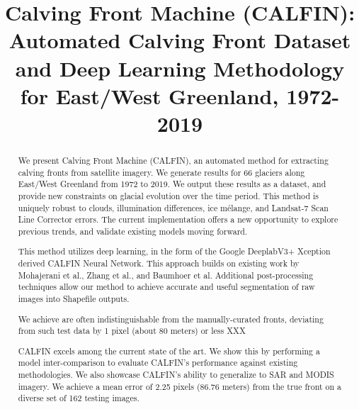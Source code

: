 \documentclass[tc, manuscript]{copernicus}
\begin{document}
\title{Calving Front Machine (CALFIN): Automated Calving Front Dataset and Deep Learning Methodology for East/West Greenland, 1972-2019}







\received{}
\pubdiscuss{} %
\revised{}
\accepted{}
\published{}

\maketitle

\begin{abstract}
We present Calving Front Machine (CALFIN), an automated method for extracting calving fronts from satellite imagery. We generate results for 66 glaciers along East/West Greenland from 1972 to 2019. We output these results as a dataset, and provide new constraints on glacial evolution over the time period. This method is uniquely robust to clouds, illumination differences, ice mélange, and Landsat-7 Scan Line Corrector errors. The current implementation offers a new opportunity to explore previous trends, and validate existing models moving forward.

This method utilizes deep learning, in the form of the Google DeeplabV3+ Xception derived CALFIN Neural Network. This approach builds on existing work by Mohajerani et al., Zhang et al., and Baumhoer et al. Additional post-processing techniques allow our method to achieve accurate and useful segmentation of raw images into Shapefile outputs. 

We achieve are often indistinguishable from the manually-curated fronts, deviating from such test data by 1 pixel (about 80 meters) or less XXX%

CALFIN excels among the current state of the art. We show this by performing a model inter-comparison to evaluate CALFIN's performance against existing methodologies. We also showcase CALFIN's ability to generalize to SAR and MODIS imagery. We achieve a mean error of 2.25 pixels (86.76 meters) from the true front on a diverse set of 162 testing images.

\end{abstract}
\end{document}
